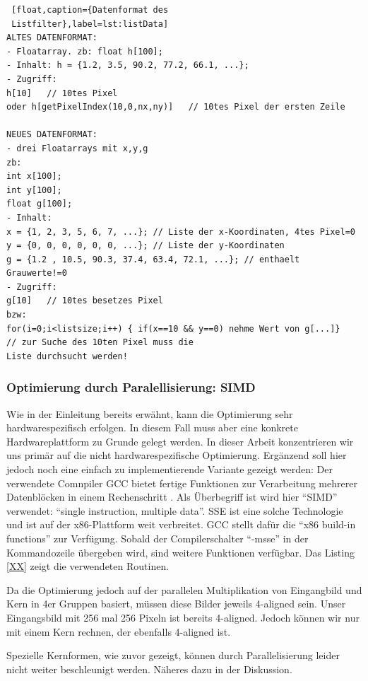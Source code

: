 \documentclass[a4paper,12pt]{article}
\begin{document}
 \begin{lstlisting} [float,caption={Datenformat des
 Listfilter},label=lst:listData] 
ALTES DATENFORMAT:
- Floatarray. zb: float h[100];
- Inhalt: h = {1.2, 3.5, 90.2, 77.2, 66.1, ...};
- Zugriff: 
h[10]	// 10tes Pixel
oder h[getPixelIndex(10,0,nx,ny)]	// 10tes Pixel der ersten Zeile

NEUES DATENFORMAT:
- drei Floatarrays mit x,y,g
zb:
int x[100];
int y[100];
float g[100];
- Inhalt:
x = {1, 2, 3, 5, 6, 7, ...}; // Liste der x-Koordinaten, 4tes Pixel=0
y = {0, 0, 0, 0, 0, 0, ...}; // Liste der y-Koordinaten
g = {1.2 , 10.5, 90.3, 37.4, 63.4, 72.1, ...}; // enthaelt Grauwerte!=0
- Zugriff:
g[10]	// 10tes besetzes Pixel
bzw:
for(i=0;i<listsize;i++) { if(x==10 && y==0) nehme Wert von g[...]}	
// zur Suche des 10ten Pixel muss die
Liste durchsucht werden!

 \end{lstlisting}


\subsubsection{Optimierung durch Paralellisierung: SIMD}\label{chp:simd}
Wie in der Einleitung bereits erwähnt, kann die Optimierung sehr
hardwarespezifisch erfolgen. In diesem Fall muss aber eine konkrete
Hardwareplattform zu Grunde gelegt werden. In dieser Arbeit konzentrieren wir
uns primär auf die nicht hardwarespezifische Optimierung. Ergänzend soll hier
jedoch noch eine einfach zu implementierende Variante gezeigt werden: Der
verwendete Comnpiler GCC bietet fertige Funktionen zur Verarbeitung mehrerer
Datenblöcken in einem Rechenschritt \cite{gcc}. Als Überbegriff ist wird hier
"`SIMD"' verwendet: "`single instruction, multiple data"'. SSE ist eine solche
Technologie und ist auf der x86-Plattform weit verbreitet. GCC stellt dafür die
"`x86 build-in functions"' zur Verfügung. Sobald der Compilerschalter "`-msse"'
in der Kommandozeile übergeben wird, sind weitere Funktionen verfügbar. Das
Listing \ref{XX} zeigt die verwendeten Routinen.

Da die Optimierung jedoch auf der parallelen Multiplikation von Eingangbild und
Kern in 4er Gruppen basiert, müssen diese Bilder jeweils 4-aligned sein. Unser
Eingangsbild mit 256 mal 256 Pixeln ist bereits 4-aligned. Jedoch können wir nur
mit einem Kern rechnen, der ebenfalls 4-aligned ist. 

Spezielle Kernformen, wie zuvor gezeigt, können durch Parallelisierung leider
nicht weiter beschleunigt werden. Näheres dazu in der Diskussion.
\end{document}
